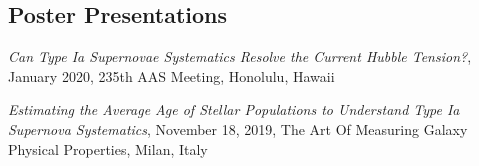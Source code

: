 \documentclass[margin]{res}
\begin{document}
\begin{resume}











\section{Poster Presentations}

\hangindent=15pt 
{\sl Can Type Ia Supernovae Systematics Resolve the Current Hubble Tension?}, January 2020, 235th AAS Meeting, Honolulu, Hawaii
\vspace{-12pt}

\hangindent=15pt 
{\sl Estimating the Average Age of Stellar Populations to Understand Type Ia Supernova Systematics}, November 18, 2019, The Art Of Measuring Galaxy Physical Properties, Milan, Italy
\vspace{-12pt}
\vspace{-12pt}


\end{resume}
\end{document}
